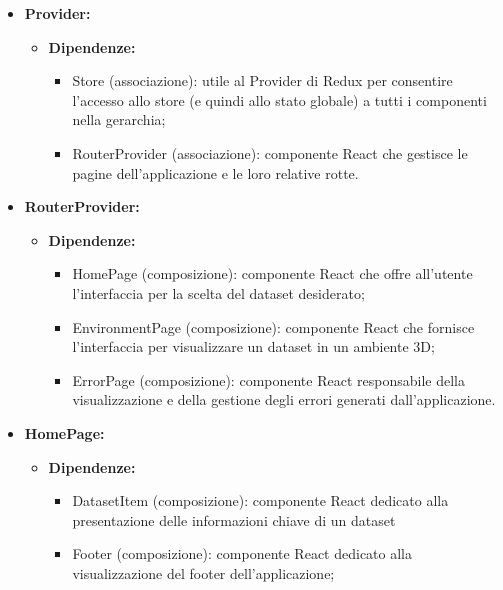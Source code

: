 \begin{itemize}
    \item \textbf{Provider:}
          \begin{itemize}
              \item \textbf{Dipendenze:}
                    \begin{itemize}
                        \item Store (associazione): utile al Provider di Redux per consentire l'accesso allo
                              store (e quindi allo stato globale) a tutti i componenti nella gerarchia;
                        \item RouterProvider (associazione): componente React che gestisce le pagine
                              dell'applicazione e le loro relative rotte.
                    \end{itemize}
          \end{itemize}

    \item \textbf{RouterProvider:}
          \begin{itemize}
              \item \textbf{Dipendenze:}
                    \begin{itemize}
                        \item HomePage (composizione): componente React che offre all'utente l'interfaccia
                              per la scelta del dataset desiderato;
                        \item EnvironmentPage (composizione): componente React che fornisce l'interfaccia per
                              visualizzare un dataset in un ambiente 3D;
                        \item ErrorPage (composizione): componente React responsabile della visualizzazione e
                              della gestione degli errori generati dall'applicazione.
                    \end{itemize}
          \end{itemize}

    \item \textbf{HomePage:}
          \begin{itemize}
              \item \textbf{Dipendenze:}
                    \begin{itemize}
                        \item DatasetItem (composizione): componente React dedicato alla presentazione delle
                              informazioni chiave di un dataset
                        \item Footer (composizione): componente React dedicato alla visualizzazione del
                              footer dell'applicazione;
                    \end{itemize}
          \end{itemize}
\end{itemize}

